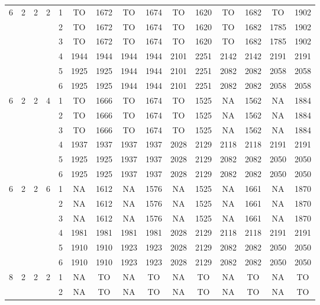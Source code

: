 \begin{longtable}{|c|c|c|c|c|c c|c c|c c|c c|c c|}
\hline
\multirow{6}{*}{6} & \multirow{6}{*}{2} & \multirow{6}{*}{2} & \multirow{6}{*}{2} & 1 & TO & 1672 & TO & 1674 & TO & 1620 & TO & 1682 & TO & 1902 \\
 & & & & 2 & TO & 1672 & TO & 1674 & TO & 1620 & TO & 1682 & 1785 & 1902 \\
 & & & & 3 & TO & 1672 & TO & 1674 & TO & 1620 & TO & 1682 & 1785 & 1902 \\
 & & & & 4 & 1944 & 1944 & 1944 & 1944 & 2101 & 2251 & 2142 & 2142 & 2191 & 2191 \\
 & & & & 5 & 1925 & 1925 & 1944 & 1944 & 2101 & 2251 & 2082 & 2082 & 2058 & 2058 \\
 & & & & 6 & 1925 & 1925 & 1944 & 1944 & 2101 & 2251 & 2082 & 2082 & 2058 & 2058 \\
\hline
\multirow{6}{*}{6} & \multirow{6}{*}{2} & \multirow{6}{*}{2} & \multirow{6}{*}{4} & 1 & TO & 1666 & TO & 1674 & TO & 1525 & NA & 1562 & NA & 1884 \\
 & & & & 2 & TO & 1666 & TO & 1674 & TO & 1525 & NA & 1562 & NA & 1884 \\
 & & & & 3 & TO & 1666 & TO & 1674 & TO & 1525 & NA & 1562 & NA & 1884 \\
 & & & & 4 & 1937 & 1937 & 1937 & 1937 & 2028 & 2129 & 2118 & 2118 & 2191 & 2191 \\
 & & & & 5 & 1925 & 1925 & 1937 & 1937 & 2028 & 2129 & 2082 & 2082 & 2050 & 2050 \\
 & & & & 6 & 1925 & 1925 & 1937 & 1937 & 2028 & 2129 & 2082 & 2082 & 2050 & 2050 \\
\hline
\multirow{6}{*}{6} & \multirow{6}{*}{2} & \multirow{6}{*}{2} & \multirow{6}{*}{6} & 1 & NA & 1612 & NA & 1576 & NA & 1525 & NA & 1661 & NA & 1870 \\
 & & & & 2 & NA & 1612 & NA & 1576 & NA & 1525 & NA & 1661 & NA & 1870 \\
 & & & & 3 & NA & 1612 & NA & 1576 & NA & 1525 & NA & 1661 & NA & 1870 \\
 & & & & 4 & 1981 & 1981 & 1981 & 1981 & 2028 & 2129 & 2118 & 2118 & 2191 & 2191 \\
 & & & & 5 & 1910 & 1910 & 1923 & 1923 & 2028 & 2129 & 2082 & 2082 & 2050 & 2050 \\
 & & & & 6 & 1910 & 1910 & 1923 & 1923 & 2028 & 2129 & 2082 & 2082 & 2050 & 2050 \\
\hline
\multirow{6}{*}{8} & \multirow{6}{*}{2} & \multirow{6}{*}{2} & \multirow{6}{*}{2} & 1 & NA & TO & NA & TO & NA & TO & NA & TO & NA & TO \\
 & & & & 2 & NA & TO & NA & TO & NA & TO & NA & TO & NA & TO \\

\end{longtable}
